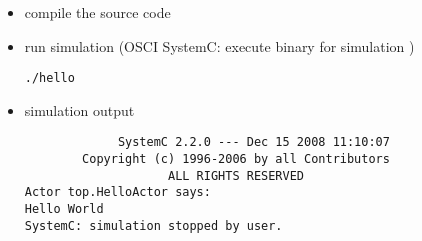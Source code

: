 \begin{frame}[fragile=singleslide]
\begin{itemize}
\item compile the source code
\item run simulation (OSCI SystemC: execute binary for simulation )
\begin{lstlisting}
./hello
\end{lstlisting}
\item simulation output
\begin{lstlisting}
             SystemC 2.2.0 --- Dec 15 2008 11:10:07
        Copyright (c) 1996-2006 by all Contributors
                    ALL RIGHTS RESERVED
Actor top.HelloActor says:
Hello World
SystemC: simulation stopped by user.
\end{lstlisting}
\end{itemize}
\end{frame}





